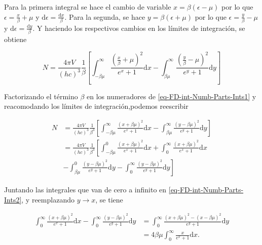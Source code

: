 Para la primera integral se hace el cambio de variable $x = \beta (\epsilon - \mu)$ por lo que  $\epsilon = \frac{x}{\beta} + \mu$ y $\mathrm{d} \epsilon = \frac{\mathrm{d}x }{\beta} $. Para la segunda, se hace $y = \beta(\epsilon + \mu)$ por lo que  $\epsilon = \frac{y}{\beta} - \mu$ y $\mathrm{d}\epsilon = \frac{\mathrm{d}y}{\beta}$. Y haciendo los respectivos cambios en los límites de integración, se obtiene 

\begin{equation}\label{eq-FD-int-Numb-Parts-Ints1}
N = \frac{4 \pi V}{(hc)^{3}} \frac{1}{\beta} \left[ \int_{-\beta \mu}^{\infty} \frac{(\frac{x}{\beta} + \mu)^{2}}{{e}^{x}+1}  \mathrm{d}x - \int_{\beta \mu}^{\infty} \frac{(\frac{y}{\beta} - \mu)^{2}}{{e}^{y}+1}  \mathrm{d}y \right]
\end{equation}

Factorizando el término $\beta$ en los numeradores de \eqref{eq-FD-int-Numb-Parts-Ints1} y reacomodando los límites de integración,podemos reescribir

\begin{equation}\label{eq-FD-int-Numb-Parts-Ints2}
\begin{split}
N &= \frac{4 \pi V}{(hc)^{3}} \frac{1}{{\beta}^{3}} \left[\int_{-\beta \mu}^{\infty} \frac{(x + \beta \mu)^{2}}{{e}^{x}+1}  \mathrm{d}x - \int_{\beta \mu}^{\infty} \frac{(y -\beta \mu)^{2}}{{e}^{y}+1}  \mathrm{d}y \right] \\
& = \frac{4 \pi V}{(hc)^{3}} \frac{1}{{\beta}^{3}} \left[ \int_{-\beta \mu}^{0} \frac{(x + \beta \mu)^{2}}{{e}^{x}+1}  \mathrm{d}x + \int_{0}^{\infty} \frac{(x + \beta \mu)^{2}}{{e}^{x}+1}\mathrm{d}x \right. \\
& \left. - \int_{\beta \mu}^{0} \frac{(y -\beta \mu)^{2}}{{e}^{y}+1}  \mathrm{d}y  - \int_{0}^{\infty} \frac{(y -\beta \mu)^{2}}{{e}^{y}+1}  \mathrm{d}y  \right]
\end{split}
\end{equation}

Juntando las integrales que van de cero a infinito en \eqref{eq-FD-int-Numb-Parts-Ints2}, y reemplazando $y \rightarrow x$, se tiene

\begin{equation}\label{eq-FD-int-Numb-Parts-IntsPart1-2}
\begin{split}
\int_{0}^{\infty} \frac{(x + \beta \mu)^{2}}{{e}^{x}+1}\mathrm{d}x - \int_{0}^{\infty} \frac{(y -\beta \mu)^{2}}{{e}^{y}+1}  \mathrm{d}y & = \int_{0}^{\infty} \frac{(x +\beta \mu)^{2} - (x -\beta \mu)^{2}}{{e}^{y}+1}  \mathrm{d}y \\
& = 4\beta \mu \int_{0}^{\infty} \frac{x}{{e}^{x} + 1} \mathrm{d} x.
\end{split}
\end{equation}

